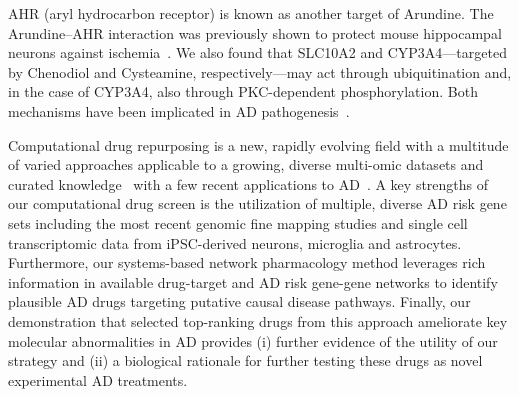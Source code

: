 \documentclass[letterpaper]{article}
\begin{document}
AHR (aryl hydrocarbon receptor) is known as another target of Arundine.  The
Arundine--AHR interaction was previously shown to protect mouse hippocampal
neurons against ischemia~\cite{Rzemieniec2019}.  We also found that SLC10A2
and CYP3A4---targeted by Chenodiol and Cysteamine, respectively---may act
through ubiquitination and, in the case of CYP3A4, also through PKC-dependent
phosphorylation.  Both mechanisms have been implicated in AD
pathogenesis~\cite{Hegde2019,Alfonso2016}.

Computational drug repurposing is a new, rapidly evolving field with a
multitude of varied approaches applicable to a growing, diverse multi-omic
datasets and curated knowledge~\citep{Pushpakom2019} with a few recent
applications to AD~\citep{Taubes2021,Fang2021}. A key strengths of our
computational drug screen is the utilization of multiple, diverse AD risk gene sets
including the most recent genomic fine mapping studies and single cell
transcriptomic data from iPSC-derived neurons, microglia and astrocytes.
Furthermore, our systems-based network pharmacology method leverages rich
information in available drug-target and AD risk gene-gene networks to identify
plausible AD drugs targeting putative causal disease pathways. Finally, our
demonstration that selected top-ranking drugs from this approach ameliorate
key molecular abnormalities in AD provides (i) further evidence of the utility
of our strategy and (ii) a biological rationale for further testing these
drugs as novel experimental AD treatments.
\end{document}
